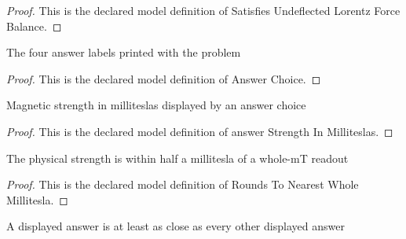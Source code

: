 \begin{proof}
  This is the declared model definition of Satisfies Undeflected Lorentz Force Balance.
\end{proof}
\begin{definition}
  \label{def:physics:phyx-mini-0496:phyxminiproblems-problemphyxmini0496-answerchoice}
  The four answer labels printed with the problem
\end{definition}
\begin{proof}
  This is the declared model definition of Answer Choice.
\end{proof}
\begin{definition}
  \label{def:physics:phyx-mini-0496:phyxminiproblems-problemphyxmini0496-answerstrengthinmilliteslas}
  Magnetic strength in milliteslas displayed by an answer choice
\end{definition}
\begin{proof}
  This is the declared model definition of answer Strength In Milliteslas.
\end{proof}
\begin{definition}
  \label{def:physics:phyx-mini-0496:phyxminiproblems-problemphyxmini0496-roundstonearestwholemillitesla}
  The physical strength is within half a millitesla of a whole-mT readout
\end{definition}
\begin{proof}
  This is the declared model definition of Rounds To Nearest Whole Millitesla.
\end{proof}
\begin{definition}
  \label{def:physics:phyx-mini-0496:phyxminiproblems-problemphyxmini0496-isclosestdisplayedchoice}
  A displayed answer is at least as close as every other displayed answer
\end{definition}
